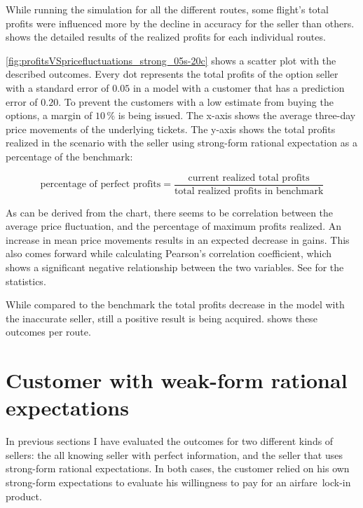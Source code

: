 
While running the simulation for all the different routes, some flight's total profits were influenced more by the decline in accuracy for the seller than others.  shows the detailed results of the realized profits for each individual routes.

\autoref{fig:profitsVSpricefluctuations_strong_05s-20c} shows a scatter plot with the described outcomes. Every dot represents the total profits of the option seller with a standard error of $0.05$ in a model with a customer that has a prediction error of $0.20$. To prevent the customers with a low estimate from buying the options, a margin of $10\,\%$ is being issued. The x-axis shows the average three-day price movements of the underlying tickets. The y-axis shows the total profits realized in the scenario with the seller using strong-form rational expectation as a percentage of the benchmark:

$$ \mbox{percentage of perfect profits} = \frac{\mbox{current realized total profits}}{\mbox{total realized profits in benchmark}} $$

As can be derived from the chart, there seems to be correlation between the average price fluctuation, and the percentage of maximum profits realized. An increase in mean price movements results in an expected decrease in gains. This also comes forward while calculating Pearson's correlation coefficient, which shows a significant negative relationship between the two variables. See  for the statistics.



While compared to the benchmark the total profits decrease in the model with the inaccurate seller, still a positive result is being acquired.  shows these outcomes per route.


\section{Customer with weak-form rational expectations}
In previous sections I have evaluated the outcomes for two different kinds of sellers: the all knowing seller with perfect information, and the seller that uses strong-form rational expectations. In both cases, the customer relied on his own strong-form expectations to evaluate his willingness to pay for an airfare~lock-in product.

